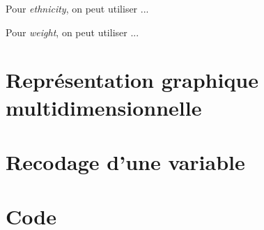 \documentclass{article}
\begin{document}
\begin{figure}[h] %
    \centering
\end{figure}
Pour \emph{ethnicity}, on peut utiliser ... %

\begin{figure}[h] %
    \centering
\end{figure}
Pour \emph{weight}, on peut utiliser ... %

\newpage
\section{Représentation graphique multidimensionnelle}











\section{Recodage d'une variable}

\begin{figure}[h] %
    \centering
\end{figure}

\newpage
\appendix

\section{Code}
%
\end{document}
